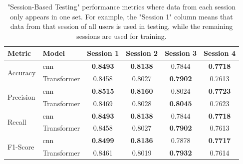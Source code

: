 \begin{table}[ht]
    \captionsetup{width=0.8\textwidth}
    \centering
    \caption{"Session-Based Testing" performance metrics where data from each session only appears in one set. For example, the "Session 1" column means that data from that session of all users is used in testing, while the remaining sessions are used for training.}
    \label{table:results_first_caseB}
    \begin{tabular}{l|lcccc}
        \toprule
        Metric & Model & Session 1 & Session 2 & Session 3 & Session 4 \\
        \midrule
        \multirow{2}{*}{Accuracy} & \acs{cnn} & \textbf{0.8493} & \textbf{0.8138} & 0.7844 & \textbf{0.7718} \\
        & Transformer & 0.8458 & 0.8027 & \textbf{0.7902} & 0.7613 \\
        \midrule
        \multirow{2}{*}{Precision} & \acs{cnn} & \textbf{0.8515} & \textbf{0.8160} & 0.8024 & \textbf{0.7723} \\
        & Transformer & 0.8469 & 0.8028 & \textbf{0.8045} & 0.7623 \\
        \midrule
        \multirow{2}{*}{Recall} & \acs{cnn} & \textbf{0.8493} & \textbf{0.8138} & 0.7844 & \textbf{0.7718} \\
        & Transformer & 0.8458 & 0.8027 & \textbf{0.7902} & 0.7613 \\
        \midrule
        \multirow{2}{*}{F1-Score} & \acs{cnn} & \textbf{0.8499} & \textbf{0.8136} & 0.7878 & \textbf{0.7717} \\
        & Transformer & 0.8461 & 0.8019 & \textbf{0.7932} & 0.7614 \\
        \bottomrule
    \end{tabular}
\end{table}

